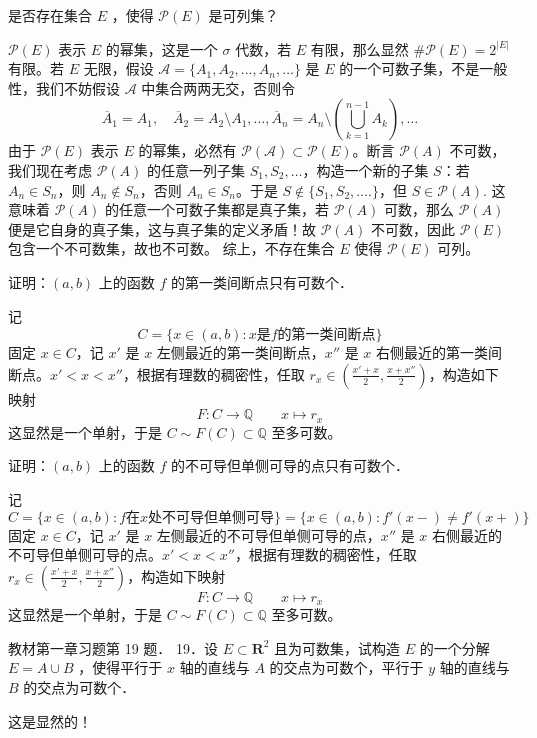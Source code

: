 \begin{exercise}
是否存在集合 $E$ ，使得 $\mathscr{P}(E)$ 是可列集？
\end{exercise}
$\mathscr{P}(E)$ 表示 $E$ 的幂集，这是一个 $\sigma$ 代数，若 $E$ 有限，那么显然 $\# \mathscr{P}(E)=2^{\lvert E \rvert}$ 有限。若 $E$ 无限，假设 $\mathcal{A=}\{ A_1,A_2,\dots,A_n,\dots \}$ 是 $E$ 的一个可数子集，不是一般性，我们不妨假设 $\mathcal{A}$ 中集合两两无交，否则令
\[
\overline{A}_{1}=A_1,\quad \overline{A}_{2}=A_2\setminus A_1,\dots,\overline{A}_n=A_n\setminus\left( \bigcup_{k=1}^{n-1} A_k \right),\dots
\]
由于 $\mathscr{P}(E)$ 表示 $E$ 的幂集，必然有 $\mathscr{P}(\mathcal{A})\subset \mathscr{P}(E)$。断言 $\mathscr{P}(A)$ 不可数，我们现在考虑 $\mathscr{P}(A)$ 的任意一列子集 $S_1,S_2,\dots$，构造一个新的子集 $S$：若 $A_n\in S_n$，则 $A_n \not\in S_n$，否则 $A_n\in S_n$。于是 $S\not\in \{ S_1,S_2,\dots. \}$，但 $S\in \mathscr{P}(A)$. 这意味着 $\mathscr{P}(A)$ 的任意一个可数子集都是真子集，若 $\mathscr{P}(A)$ 可数，那么 $\mathscr{P}(A)$ 便是它自身的真子集，这与真子集的定义矛盾！故 $\mathscr{P}(A)$ 不可数，因此 $\mathscr{P}(E)$ 包含一个不可数集，故也不可数。
综上，不存在集合 $E$ 使得 $\mathscr{P}(E)$ 可列。

\begin{exercise}
证明：$(a, b)$ 上的函数 $f$ 的第一类间断点只有可数个．
\end{exercise}
记
\[
C=\{ x\in(a,b):x\text{是}f\text{的第一类间断点} \}
\]
固定 $x\in C$，记 $x'$ 是 $x$ 左侧最近的第一类间断点，$x''$ 是 $x$ 右侧最近的第一类间断点。$x'<x<x''$，根据有理数的稠密性，任取 $r_{x}\in\left( \frac{x'+x}{2},\frac{x+x''}{2} \right)$，构造如下映射
\[
F:C\to \mathbb{Q}\qquad x\mapsto r_{x}
\]
这显然是一个单射，于是 $C\sim F(C)\subset \mathbb{Q}$ 至多可数。

\begin{exercise}
证明：$(a, b)$ 上的函数 $f$ 的不可导但单侧可导的点只有可数个．
\end{exercise}
记
\[
C=\{ x\in(a,b):f\text{在}x\text{处不可导但单侧可导} \}=\{ x\in(a,b):f'(x-)\neq f'(x+) \}
\]
固定 $x\in C$，记 $x'$ 是 $x$ 左侧最近的不可导但单侧可导的点，$x''$ 是 $x$ 右侧最近的不可导但单侧可导的点。$x'<x<x''$，根据有理数的稠密性，任取 $r_{x}\in\left( \frac{x'+x}{2},\frac{x+x''}{2} \right)$，构造如下映射
\[
F:C\to \mathbb{Q}\qquad x\mapsto r_{x}
\]
这显然是一个单射，于是 $C\sim F(C)\subset \mathbb{Q}$ 至多可数。

\begin{exercise}
教材第一章习题第 19 题．
19．设 $E \subset \mathbf{R}^2$ 且为可数集，试构造 $E$ 的一个分解 $E=A \cup B$ ，使得平行于 $x$ 轴的直线与 $A$ 的交点为可数个，平行于 $y$ 轴的直线与 $B$ 的交点为可数个．
\end{exercise}
这是显然的！
